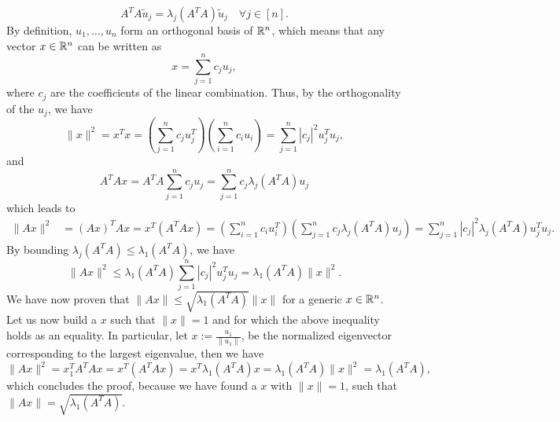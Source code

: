 \documentclass{ExerciseSheet}
\begin{document}
\begin{solution}
\begin{equation*}
	A^TA \tilde{u}_j= \lambda_j(A^TA) \tilde{u}_j \quad \forall j\in[n].
\end{equation*}
By definition, $u_1, \dots, u_n$ form an orthogonal basis of $\mathbb{R}^n$, which means that any vector $x\in\mathbb{R}^n$ can be written as 
\begin{equation*}
	x =\sum_{j=1}^{n}c_ju_j,
\end{equation*}
where $c_j$ are the coefficients of the linear combination. Thus, by the orthogonality of the $u_j$, we have 
\begin{equation*}
	\| x\|^2 = x^Tx=\left(\sum_{j=1}^{n}c_j u_j^T\right) \left(\sum_{i=1}^{n}c_iu_i\right) = \sum_{j=1}^{n}|c_j|^2 u_j^Tu_j,
\end{equation*}
and 
\begin{equation*}
A^TA x =A^TA \sum_{j=1}^{n}c_ju_j = \sum_{j=1}^{n}c_j \lambda_j(A^TA) u_j
\end{equation*}
which leads to 
\begin{align*}
	\| A x\|^2 &= (Ax)^TA x=x^T(A^TAx) = \left(\sum_{i=1}^{n}c_iu_i^T\right) \left(\sum_{j=1}^{n}c_j \lambda_j(A^TA) u_j\right)= \sum_{j=1}^{n}|c_j|^2 \lambda_j(A^TA) u_j^Tu_j.
\end{align*}
By bounding $\lambda_j(A^TA) \leq \lambda_1(A^TA)$, we have
\begin{equation*}
	\| A x\|^2 \leq \lambda_1(A^TA) \sum_{j=1}^{n}|c_j|^2 u_j^Tu_j = \lambda_1(A^TA)\| x\|^2.
\end{equation*}
We have now proven that $\| A x\| \leq \sqrt{\lambda_1(A^TA)}\| x\|$ for a generic $x\in \mathbb{R}^n$. Let us now build a $x$ such that $\|x\|=1$ and for which the above inequality holds as an equality. In particular, let $x:= \frac{u_1}{\|u_1\|}$, be the normalized eigenvector corresponding to the largest eigenvalue, then we have 
\begin{equation*}
\|A x\|^2 =  x_1^TA^TA x=  x^T(A^TA x)= x^T\lambda_1(A^TA) x = \lambda_1(A^TA) \|x\|^2= \lambda_1(A^TA),
\end{equation*}
which concludes the proof, because we have found a $x$ with $\|x\|=1$, such that $\| A x\|\!\!=\!\!\sqrt{\lambda_1(A^TA)}.$

\end{solution}
\fi
\end{document}
